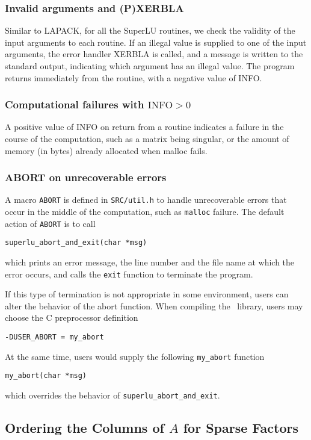 \subsubsection{Invalid arguments and (P)XERBLA}
Similar to LAPACK, for all the SuperLU routines,
we check the validity of the input arguments to each routine.
If an illegal value is supplied to one of the input arguments,
the error handler XERBLA is called, and a message is written to
the standard output, indicating which argument has an illegal value.
The program returns immediately from the routine,
with a negative value of INFO.

\subsubsection{Computational failures with $\mbox{INFO} > 0$}
A positive value of INFO on return from a routine indicates
a failure in the course of the computation, such as 
a matrix being singular, or the amount
of memory (in bytes) already allocated when malloc fails.

\subsubsection{ABORT on unrecoverable errors}
\label{sec:abort}
A macro {\tt ABORT} is defined in {\tt SRC/util.h} to handle
unrecoverable errors that occur in the middle of the computation,
such as {\tt malloc} failure. The default action of {\tt ABORT} is to call

{\tt superlu\_abort\_and\_exit(char *msg)}

\noindent which prints an error message, the line number and the file name
at which the error occurs, and calls the {\tt exit} function to terminate 
the program.

If this type of termination is not appropriate in some environment,
users can alter the behavior of the abort function. When compiling the
\SuperLU\ library, users may choose the C preprocessor definition 

{\tt -DUSER\_ABORT = my\_abort}

\noindent At the same time, users would supply the following
{\tt my\_abort} function

{\tt my\_abort(char *msg)}

\noindent which overrides the behavior of {\tt superlu\_abort\_and\_exit}.


\subsection{Ordering the Columns of $A$ for Sparse Factors}

